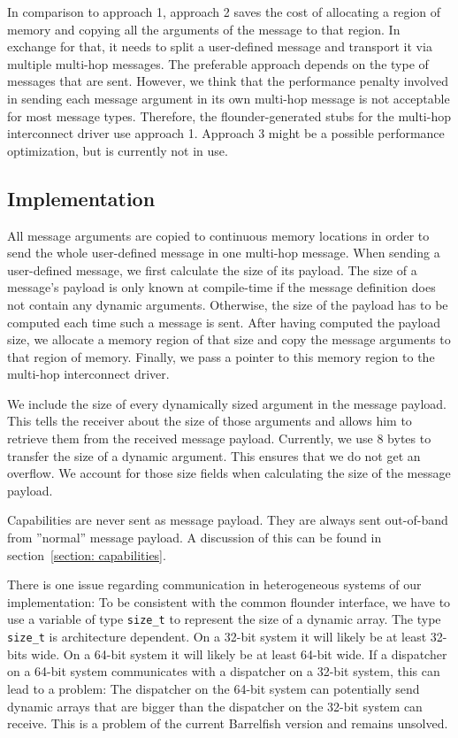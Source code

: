 \documentclass[a4paper,twoside]{report} %
\begin{document}
In comparison to approach 1, approach 2 saves the cost of allocating a region of memory and copying all the arguments of the message to that region. In exchange for that, it needs to split a user-defined message and transport it via multiple multi-hop messages. The preferable approach depends on the type of messages that are sent. However, we think that the performance penalty involved in sending each message argument in its own multi-hop message is not acceptable for most message types. Therefore, the flounder-generated stubs for the multi-hop interconnect driver use approach 1. Approach 3 might be a possible performance optimization, but is currently not in use.

\subsection{Implementation}
All message arguments are copied to continuous memory locations in order to send the whole user-defined message in one multi-hop message.
When sending a user-defined message, we first calculate the size of its payload. The size of a message's payload is only known at compile-time if the message definition does not contain any dynamic arguments. Otherwise, the size of the payload has to be computed each time such a message is sent. After having computed the payload size, we allocate a memory region of that size and copy the message arguments to that region of memory. Finally, we pass a pointer to this memory region to the multi-hop interconnect driver.

We include the size of every dynamically sized argument in the message payload. This tells the receiver about the size of those arguments and allows him to retrieve them from the received message payload. Currently, we use 8 bytes to transfer the size of a dynamic argument. This ensures that we do not get an overflow. We account for those size fields when calculating the size of the message payload.

Capabilities are never sent as message payload. They are always sent out-of-band from ''normal'' message payload. A discussion of this can be found in section~\ref{section: capabilities}.

There is one issue regarding communication in heterogeneous systems of our implementation: To be consistent  with the common flounder interface, we have to use a variable of type \texttt{size\_t} to represent the size of a dynamic array. The type \texttt{size\_t} is architecture dependent. On a 32-bit system it will likely be at least 32-bits wide. On a 64-bit system it will likely be at least 64-bit wide. If a dispatcher on a 64-bit system communicates with a dispatcher on a 32-bit system, this can lead to a problem: The dispatcher on the 64-bit system can potentially send dynamic arrays that are bigger than the dispatcher on the 32-bit system can receive. This is a problem of the current Barrelfish version and remains unsolved.
\end{document}
